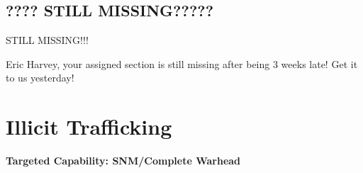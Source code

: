 \documentclass{report}
\begin{document}
\subsection{???? STILL MISSING?????}

STILL MISSING!!!

Eric Harvey, your assigned section is still missing after being 3 weeks late! Get it to us yesterday!



% 
% 








\section{Illicit Trafficking} \label{sec:Trafficking}


\bfseries Targeted Capability: SNM/Complete Warhead 
\end{document}

